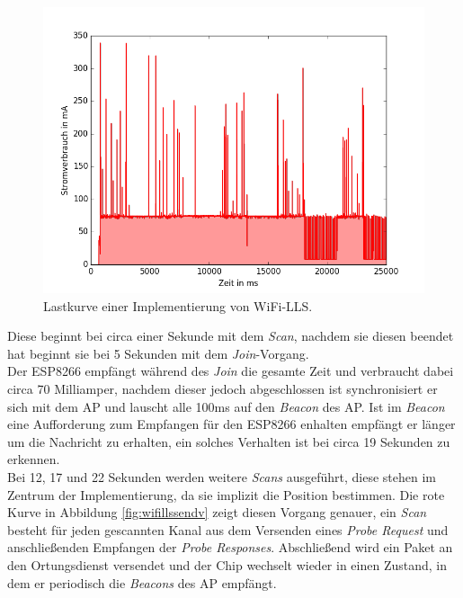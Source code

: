\begin{figure}[h!]
  \centering
	\includegraphics[width=\textwidth]{plots/wifills.png}
  \caption{Lastkurve einer Implementierung von WiFi-LLS.}
  \label{fig:wifills}
\end{figure}

Diese beginnt bei circa einer Sekunde mit dem \emph{Scan}, nachdem sie diesen beendet hat beginnt sie bei 5 Sekunden mit dem \emph{Join}-Vorgang.\\
Der ESP8266 empfängt während des \emph{Join} die gesamte Zeit und verbraucht dabei circa 70 Milliamper, nachdem dieser jedoch abgeschlossen ist synchronisiert er sich mit dem AP und lauscht alle 100ms auf den \emph{Beacon} des AP.
Ist im \emph{Beacon} eine Aufforderung zum Empfangen für den ESP8266 enhalten empfängt er länger um die Nachricht zu erhalten, ein solches Verhalten ist bei circa 19 Sekunden zu erkennen.\\
Bei 12, 17 und 22 Sekunden werden weitere \emph{Scans} ausgeführt, diese stehen im Zentrum der Implementierung, da sie implizit die Position bestimmen.
Die rote Kurve in Abbildung \ref{fig:wifillssendv} zeigt diesen Vorgang genauer, ein \emph{Scan} besteht für jeden gescannten Kanal aus dem Versenden eines \emph{Probe Request} und anschließenden Empfangen der \emph{Probe Responses}. 
Abschließend wird ein Paket an den Ortungsdienst versendet und der Chip wechselt wieder in einen Zustand, in dem er periodisch die \emph{Beacons} des AP empfängt.\\

